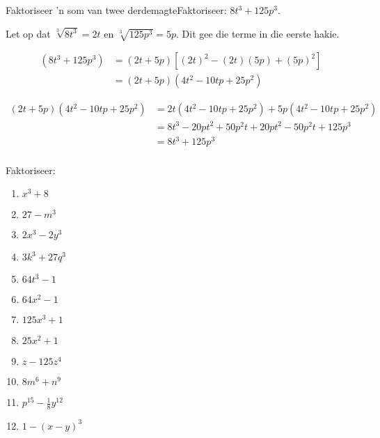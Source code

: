 \begin{wex}{Faktoriseer 'n som van twee derdemagte}{Faktoriseer: $8t^{3} +125p^{3}$.}
{

Let op dat $\sqrt[3]{8t^{3}} = 2t$ en $\sqrt[3]{125p^{3}} = 5p$. Dit gee die terme in die eerste hakie.
\newline

\begin{align*}
  (8t^{3} +125p^{3}) &= (2t + 5p)\left[(2t)^{2} - (2t)(5p)+(5p)^{2}\right] \\
                     &= (2t+5p)(4t^{2} - 10tp + 25p^{2})
\end{align*}

\begin{align*}
  (2t+5p)(4t^{2} - 10tp + 25p^{2}) &= 2t(4t^{2} - 10tp + 25p^{2})+5p(4t^{2} - 10tp + 25p^{2})\\
		   &= 8t^{3} - 20pt^{2} + 50p^{2}t+ 20pt^{2} - 50p^{2}t + 125p^{3}\\
		   &= 8t^{3} +125p^{3}\\
\end{align*}
}
\end{wex}


\begin{exercises}{}
{

Faktoriseer:
\begin{multicols}{2}
\begin{enumerate}[itemsep=5pt, label=\textbf{\arabic*}. ] 
\item ${x}^{3}+8$
\item $27-m^{3}$
\item $2x^{3}-2y^{3}$
\item $3k^{3} + 27q^{3}$
\item $64t^{3}-1$
\item $64x^{2} -1$
\item $125x^{3} +1$
\item $25x^{2} +1$
\item $z-125z^4{}$
\item $8m^{6} + n^{9}$
\item $p^{15} - \frac{1}{8}y^{12}$
\item $1- (x-y)^3$
\end{enumerate}
\end{multicols}

}
\end{exercises}


